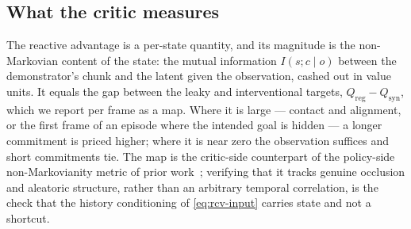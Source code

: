 \subsection{What the critic measures}
\label{sec:method:diagnostic}

The reactive advantage is a per-state quantity, and its magnitude is the non-Markovian content of the
state: the mutual information $I(s;c\mid o)$ between the demonstrator's chunk and the latent given the
observation, cashed out in value units. It equals the gap between the leaky and interventional targets,
$Q_{\mathrm{reg}}-Q_{\mathrm{syn}}$, which we report per frame as a map. Where it is large --- contact
and alignment, or the first frame of an episode where the intended goal is hidden --- a longer
commitment is priced higher; where it is near zero the observation suffices and short commitments tie.
The map is the critic-side counterpart of the policy-side non-Markovianity metric of prior
work~\citep{lazzati2026chunking}; verifying that it tracks genuine occlusion and aleatoric structure,
rather than an arbitrary temporal correlation, is the check that the history conditioning of
\eqref{eq:rcv-input} carries state and not a shortcut.
